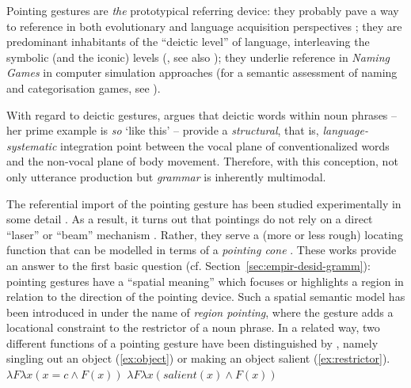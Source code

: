 \documentclass[output=paper
                ,modfonts
                ,nonflat
	        ,collection
	        ,collectionchapter
	        ,collectiontoclongg
 	        ,biblatex
                ,babelshorthands
                ,newtxmath
                ,draftmode
                ,colorlinks, citecolor=brown
]{./langsci/langscibook}
\begin{document}
 
Pointing gestures are \emph{the} prototypical referring device:
%
they probably pave a way to reference in both evolutionary and language acquisition perspectives \citep{Bruner:1998,Masataka:2003,Matthews:Behne:Lieven:Tomasello:2012};
%
they are predominant inhabitants of the \enquote{deictic level} of language, interleaving the symbolic (and the iconic) levels (\citealp{Levinson:2008}, see also \citealp{Buehler:1934:ORIG});
%
they underlie reference in \textit{Naming Games} in computer simulation approaches \citep{Steels:1995} (for a semantic assessment of naming and categorisation games, see \citealp{Luecking:Mehler:2012}).  


With regard to deictic gestures, \citet[Sec.~5.4]{Fricke:2012} argues that deictic words  within noun phrases -- her prime example is  \emph{so} `like this' -- provide a \emph{structural}, that is, \emph{language-systematic} integration point between the vocal plane of conventionalized words and the non-vocal plane of body movement. 
%
Therefore, with this conception, not only utterance production but \emph{grammar} is inherently multimodal. 

The referential import of the pointing gesture has been studied experimentally in some detail \citep{Bangerter:Oppenheimer:2006,Kranstedt:Luecking:Pfeiffer:Rieser:Wachsmuth:2006:a,Kranstedt:Luecking:Pfeiffer:Rieser:Wachsmuth:2006:b,van:der:Sluis:Krahmer:2007}. 
%
As a result, it turns out that pointings do not rely on a direct \enquote{laser} or \enquote{beam} mechanism \citep{McGinn:1981}.
%
Rather, they serve a (more or less rough) locating function \citep{Clark:1996} that can be modelled in terms of a \emph{pointing cone} \citep{Kranstedt:Luecking:Pfeiffer:Rieser:Wachsmuth:2006:a,Luecking:Pfeiffer:Rieser:2015}. 
%
These works provide an answer to the first basic question (cf. Section~\ref{sec:empir-desid-gramm}): pointing gestures have a \enquote{spatial meaning} which focuses or highlights a region in relation to the direction of the pointing device.
%
Such a spatial semantic model has been introduced in \citet{Rieser:2004} under the name of \emph{region pointing}, where the gesture adds a locational constraint to the restrictor of a noun phrase.
%
In a related way, two different functions of a pointing gesture have been distinguished by \citet{Kuehnlein:Nimke:Stegmann:2002}, namely singling out an object (\ref{ex:object}) or making an object salient (\ref{ex:restrictor}).
%
\ea \label{ex:pointing-functions}
\ea \label{ex:object}
$\lambda F \lambda x (x = c \wedge F(x))$
\ex \label{ex:restrictor}
$\lambda F \lambda x (\textit{salient}(x) \wedge F(x))$
\z 
\z
\end{document}
